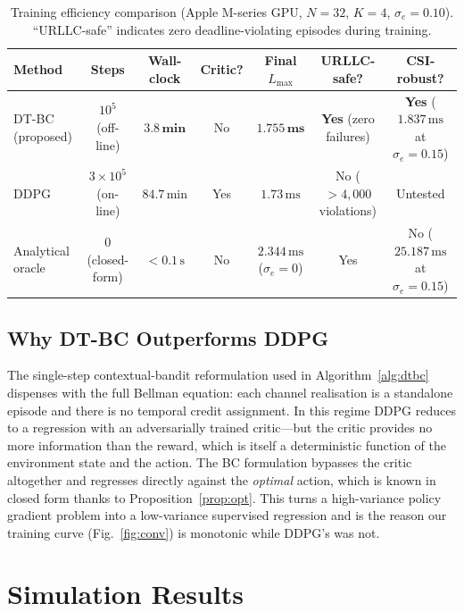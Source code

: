 \documentclass[journal]{IEEEtran}
\begin{document}
\begin{table}[t]
\centering
\caption{Training efficiency comparison (Apple M-series GPU,
$N\!=\!32$, $K\!=\!4$, $\sigma_e\!=\!0.10$). ``URLLC-safe''
indicates zero deadline-violating episodes during training.}
\label{tab:training}
\begin{tabular}{lcccccc}
\toprule
\textbf{Method} &
\textbf{Steps} &
\textbf{Wall-clock} &
\textbf{Critic?} &
\textbf{Final $L_{\max}$} &
\textbf{URLLC-safe?} &
\textbf{CSI-robust?} \\
\midrule
DT-BC (proposed)
  & $10^5$ (off-line)
  & $\mathbf{3.8\,\text{min}}$
  & No
  & $\mathbf{1.755\,\text{ms}}$
  & \textbf{Yes} (zero failures)
  & \textbf{Yes} ($1.837\,\text{ms}$ at $\sigma_e\!=\!0.15$) \\
DDPG \cite{lillicrap2016continuous}
  & $3\!\times\!10^5$ (on-line)
  & $84.7\,\text{min}$
  & Yes
  & $1.73\,\text{ms}$
  & No ($>\!4{,}000$ violations)
  & Untested \\
Analytical oracle
  & 0 (closed-form)
  & $<\!0.1\,\text{s}$
  & No
  & $2.344\,\text{ms}$ ($\sigma_e\!=\!0$)
  & Yes
  & No ($25.187\,\text{ms}$ at $\sigma_e\!=\!0.15$) \\
\bottomrule
\end{tabular}
\end{table}

\subsection{Why DT-BC Outperforms DDPG}

The single-step contextual-bandit reformulation used in
Algorithm~\ref{alg:dtbc} dispenses with the full Bellman equation:
each channel realisation is a standalone episode and there is no
temporal credit assignment. In this regime DDPG reduces to a
regression with an adversarially trained critic---but the critic
provides no more information than the reward, which is itself a
deterministic function of the environment state and the action.
The BC formulation bypasses the critic altogether and regresses
directly against the \emph{optimal} action, which is known in closed
form thanks to Proposition~\ref{prop:opt}. This turns a
high-variance policy gradient problem into a low-variance
supervised regression and is the reason our training curve
(Fig.~\ref{fig:conv}) is monotonic while DDPG's was not.

\section{Simulation Results}
\label{sec:results}
\end{document}
